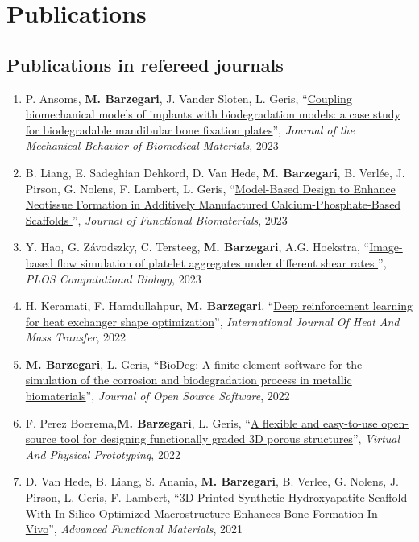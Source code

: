 \documentclass{cv}
\begin{document}
\section{Publications}

\subsection{Publications in refereed journals}
\begin{enumerate}[itemsep=-0.2ex]
\item
P. Ansoms, \textbf{M. Barzegari}, J. Vander Sloten, L. Geris, ``\href{https://doi.org/10.1016/j.jmbbm.2023.106120}{Coupling biomechanical models of implants with biodegradation models: a case study for biodegradable mandibular bone fixation plates}'', \textit{Journal of the Mechanical Behavior of Biomedical Materials}, 2023
\item
B. Liang, E. Sadeghian Dehkord, D. Van Hede, \textbf{M. Barzegari}, B. Verlée, J. Pirson, G. Nolens, F. Lambert, L. Geris, ``\href{https://doi.org/10.3390/jfb14120563}{Model-Based Design to Enhance Neotissue Formation in Additively Manufactured Calcium-Phosphate-Based Scaffolds
}'', \textit{Journal of Functional Biomaterials}, 2023
\item
Y. Hao, G. Závodszky, C. Tersteeg, \textbf{M. Barzegari}, A.G. Hoekstra, ``\href{https://doi.org/10.1371/journal.pcbi.1010965}{Image-based flow simulation of platelet aggregates under different shear rates
}'', \textit{PLOS Computational Biology}, 2023
\item
H. Keramati, F. Hamdullahpur, \textbf{M. Barzegari}, ``\href{https://doi.org/10.1016/j.ijheatmasstransfer.2022.123112}{Deep reinforcement learning for heat exchanger shape optimization}'', \textit{International  Journal Of Heat And Mass Transfer}, 2022
\item
\textbf{M. Barzegari}, L. Geris, ``\href{https://doi.org/10.21105/joss.04281}{BioDeg: A finite element software for the simulation of the corrosion and biodegradation process in metallic biomaterials}'', \textit{Journal of Open Source Software}, 2022
\item
F. Perez Boerema,\textbf{M. Barzegari}, L. Geris, ``\href{https://doi.org/10.1080/17452759.2022.2048956}{A flexible and easy-to-use open-source tool for designing functionally graded 3D porous structures}'', \textit{Virtual And Physical Prototyping}, 2022
\item
D. Van Hede, B. Liang, S. Anania, \textbf{M. Barzegari}, B. Verlee, G. Nolens, J. Pirson, L. Geris, F. Lambert, ``\href{https://doi.org/10.1002/adfm.202105002}{3D-Printed Synthetic Hydroxyapatite Scaffold With In Silico Optimized Macrostructure Enhances Bone Formation In Vivo}'', \textit{Advanced Functional Materials}, 2021

\end{enumerate}
\end{document}
